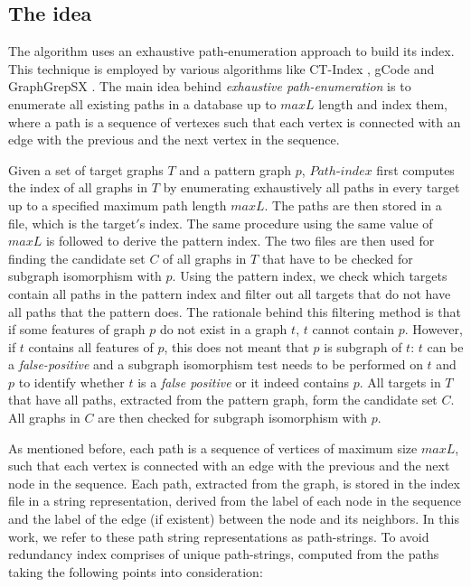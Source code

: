 \documentclass{l4proj}
\begin{document}
\subsection{The idea}
\label{path-index-idea}
    The algorithm uses an exhaustive path-enumeration approach to build its index. This technique is employed by various algorithms like CT-Index \cite{ctindex}, gCode \cite{gcode} and GraphGrepSX \cite{graphgrepsx}. The main idea behind \textit{exhaustive path-enumeration} is to enumerate all existing paths in a database up to $maxL$ length and index them, where a path is a sequence of vertexes such that each vertex is connected with an edge with the previous and the next vertex in the sequence.\par
   Given a set of target graphs $T$ and a pattern graph $p$, $Path$-$index$ first computes the index of all graphs in $T$ by enumerating exhaustively all paths in every target up to a specified maximum path length $maxL$. The paths are then stored in a file, which is the target$'$s index. The same procedure using the same value of $maxL$ is followed to derive the pattern index. The two files are then used for finding the candidate set $C$ of all graphs in $T$ that have to be checked for subgraph isomorphism with $p$. Using the pattern index, we check which targets contain all paths in the pattern index and filter out all targets that do not have all paths that the pattern does. The rationale behind this filtering method is that if some features of graph $p$ do not exist in a graph $t$, $t$ cannot contain $p$. However, if $t$ contains all features of $p$, this does not meant that $p$ is subgraph of $t$: $t$ can be a \textit{false-positive} and a subgraph isomorphism test needs to be performed on $t$ and $p$ to identify whether $t$ is a \textit{false positive} or it indeed contains $p$. All targets in $T$ that have all paths, extracted from the pattern graph, form the candidate set $C$. All graphs in $C$ are then checked for subgraph isomorphism with $p$. \par
As mentioned before, each path is a sequence of vertices of maximum size $maxL$, such that each vertex is connected with an edge with the previous and the next node in the sequence. Each path, extracted from the graph, is stored in the index file in a string representation, derived from the label of each node in the sequence and the label of the edge (if existent) between the node and its neighbors. In this work, we refer to these path string representations as path-strings. To avoid redundancy index comprises of unique path-strings, computed from the paths taking the following points into consideration:
\end{document}
